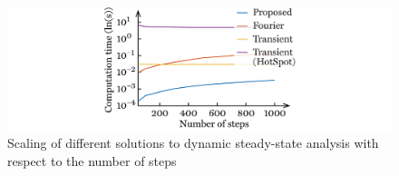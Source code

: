 \begin{figure}
  \centering
  \includegraphics[width=1.0\linewidth]{include/assets/figures/dream-dynamic-steady-state-speed-steps.pdf}
  \caption{
    Scaling of different solutions to dynamic steady-state analysis with respect
    to the number of steps
  }
\end{figure}

